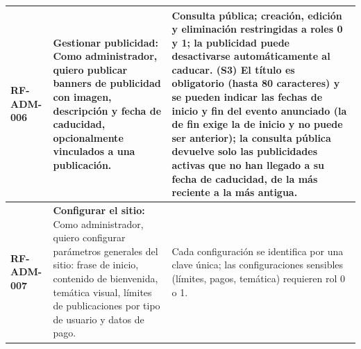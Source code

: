 \begin{longtable}{|l||p{7cm}|p{4.5cm}|}
\hline
\textbf{RF-ADM-006} & \textbf{Gestionar publicidad:} Como administrador, quiero publicar banners de publicidad con imagen, descripción y fecha de caducidad, opcionalmente vinculados a una publicación. & Consulta pública; creación, edición y eliminación restringidas a roles 0 y 1; la publicidad puede desactivarse automáticamente al caducar. \textbf{(S3)} El título es obligatorio (hasta 80 caracteres) y se pueden indicar las fechas de inicio y fin del evento anunciado (la de fin exige la de inicio y no puede ser anterior); la consulta pública devuelve solo las publicidades activas que no han llegado a su fecha de caducidad, de la más reciente a la más antigua. \\
\hline
\textbf{RF-ADM-007} & \textbf{Configurar el sitio:} Como administrador, quiero configurar parámetros generales del sitio: frase de inicio, contenido de bienvenida, temática visual, límites de publicaciones por tipo de usuario y datos de pago. & Cada configuración se identifica por una clave única; las configuraciones sensibles (límites, pagos, temática) requieren rol 0 o 1. \\
\hline
\end{longtable}

